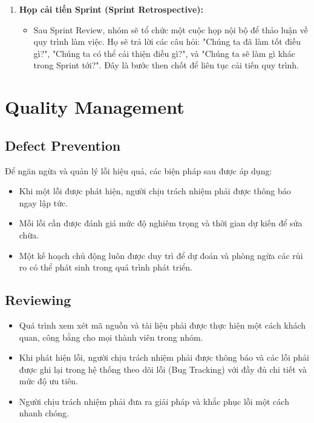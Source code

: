 \documentclass[a4paper,12pt]{article}
\begin{document}
\begin{enumerate}
		\item \textbf{Họp cải tiến Sprint (Sprint Retrospective):}
		\begin{itemize}
			\item Sau Sprint Review, nhóm sẽ tổ chức một cuộc họp nội bộ để thảo luận về quy trình làm việc. Họ sẽ trả lời các câu hỏi: "Chúng ta đã làm tốt điều gì?", "Chúng ta có thể cải thiện điều gì?", và "Chúng ta sẽ làm gì khác trong Sprint tới?". Đây là bước then chốt để liên tục cải tiến quy trình.
		\end{itemize}
	\end{enumerate}
	
	\section{Quality Management}
	
	\subsection{Defect Prevention}
	
	Để ngăn ngừa và quản lý lỗi hiệu quả, các biện pháp sau được áp dụng:
	
	\begin{itemize}
		\item Khi một lỗi được phát hiện, người chịu trách nhiệm phải được thông báo ngay lập tức.
		\item Mỗi lỗi cần được đánh giá mức độ nghiêm trọng và thời gian dự kiến để sửa chữa.
		\item Một kế hoạch chủ động luôn được duy trì để dự đoán và phòng ngừa các rủi ro có thể phát sinh trong quá trình phát triển.
	\end{itemize}
	
	\subsection{Reviewing}
	
	\begin{itemize}
		\item Quá trình xem xét mã nguồn và tài liệu phải được thực hiện một cách khách quan, công bằng cho mọi thành viên trong nhóm.
		\item Khi phát hiện lỗi, người chịu trách nhiệm phải được thông báo và các lỗi phải được ghi lại trong hệ thống theo dõi lỗi (Bug Tracking) với đầy đủ chi tiết và mức độ ưu tiên.
		\item Người chịu trách nhiệm phải đưa ra giải pháp và khắc phục lỗi một cách nhanh chóng.
	\end{itemize}
	
\end{document}
